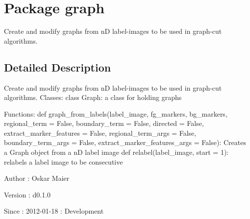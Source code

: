 \hypertarget{namespacegraph}{
\section{Package graph}
\label{namespacegraph}
}


Create and modify graphs from nD label-\/images to be used in graph-\/cut algorithms.  




\subsection{Detailed Description}
Create and modify graphs from nD label-\/images to be used in graph-\/cut algorithms. Classes: class Graph: a class for holding graphs

Functions: def graph\_\-from\_\-labels(label\_\-image, fg\_\-markers, bg\_\-markers, regional\_\-term = False, boundary\_\-term = False, directed = False, extract\_\-marker\_\-features = False, regional\_\-term\_\-args = False, boundary\_\-term\_\-args = False, extract\_\-marker\_\-features\_\-args = False): Creates a Graph object from a nD label image def relabel(label\_\-image, start = 1): relabels a label image to be consecutive

\begin{DoxyAuthor}{Author}
: Oskar Maier 
\end{DoxyAuthor}
\begin{DoxyVersion}{Version}
: d0.1.0 
\end{DoxyVersion}
\begin{DoxySince}{Since}
: 2012-\/01-\/18 : Development 
\end{DoxySince}
